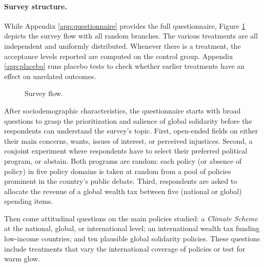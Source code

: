 \documentclass[12pt,english]{article}
\begin{document}
\begin{bibunit}
\paragraph{Survey structure.}
While Appendix \ref{app:questionnaire} provides the full questionnaire, Figure \ref{fig:flow} depicts the survey flow with all random branches. The various treatments are all independent and uniformly distributed. Whenever there is a treatment, the acceptance levels reported are computed on the control group. Appendix \ref{app:placebo} runs placebo tests to check whether earlier treatments have an effect on unrelated outcomes. 
\begin{figure}[h!]
    \caption[Survey flow]{Survey flow.
    }\label{fig:flow}
\end{figure}

After sociodemographic characteristics, the questionnaire starts with broad questions to grasp the prioritization and salience of global solidarity before the respondents can understand the survey's topic. First, open-ended fields on either their main concerns, wants, issues of interest, or perceived injustices. Second, a conjoint experiment where respondents have to select their preferred political program, or abstain. Both programs are random: each policy (or absence of policy) in five policy domains is taken at random from a pool of policies prominent in the country's public debate. Third, respondents are asked to allocate the revenue of a global wealth tax between five (national or global) spending items. 

Then come attitudinal questions on the main policies studied: a \textit{Climate Scheme} at the national, global, or international level; an international wealth tax funding low-income countries; and ten plausible global solidarity policies. These questions include treatments that vary the international coverage of policies or test for warm glow. 


\end{bibunit}
\end{document}
